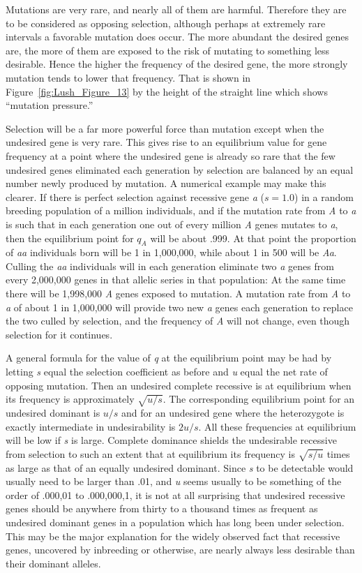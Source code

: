 Mutations are very rare, and nearly all of them are harmful. Therefore
they are to be considered as opposing selection, although perhaps
at extremely rare intervals a favorable mutation does occur. The more
abundant the desired genes are, the more of them are exposed to the
risk of mutating to something less desirable. Hence the higher the frequency
of the desired gene, the more strongly mutation tends to lower
that frequency. That is shown in Figure~\ref{fig:Lush_Figure_13} by the height of the straight
line which shows ``mutation pressure.''

Selection will be a far more powerful force than mutation except
when the undesired gene is very rare. This gives rise to an equilibrium
value for gene frequency at a point where the undesired gene is already
so rare that the few undesired genes eliminated each generation by
selection are balanced by an equal number newly produced by mutation.
A numerical example may make this clearer. If there is perfect
selection against recessive gene \textit{a} ($s = 1.0$) in a random breeding population
of a million individuals, and if the mutation rate from \textit{A} to \textit{a} is
such that in each generation one out of every million \textit{A} genes mutates
to \textit{a}, then the equilibrium point for $q_A$ will be about .999. At that point
the proportion of \textit{aa} individuals born will be 1 in 1,000,000, while
about 1 in 500 will be \textit{Aa}. Culling the \textit{aa} individuals will in each generation
eliminate two \textit{a} genes from every 2,000,000 genes in that allelic
series in that population: At the same time there will be 1,998,000 \textit{A}
genes exposed to mutation. A mutation rate from \textit{A} to \textit{a} of about 1 in
1,000,000 will provide two new \textit{a} genes each generation to replace the
two culled by selection, and the frequency of \textit{A} will not change, even
though selection for it continues.

A general formula for the value of \textit{q} at the equilibrium point may
be had by letting \textit{s} equal the selection coefficient as before and \textit{u} equal
the net rate of opposing mutation. Then an undesired complete recessive
is at equilibrium when its frequency is approximately $\sqrt{u/s}$. The
corresponding equilibrium point for an undesired dominant is $u/s$
and for an undesired gene where the heterozygote is exactly intermediate
in undesirability is $2u/s$. All these frequencies at equilibrium will
be low if \textit{s} is large. Complete dominance shields the undesirable recessive
from selection to such an extent that at equilibrium its frequency is
$\sqrt{s/u}$ times as large as that of an equally undesired dominant. Since \textit{s}
to be detectable would usually need to be larger than .01, and \textit{u} seems
usually to be something of the order of .000,01 to .000,000,1, it is not at
all surprising that undesired recessive genes should be anywhere from
thirty to a thousand times as frequent as undesired dominant genes in a
population which has long been under selection. This may be the major
explanation for the widely observed fact that recessive genes, uncovered
by inbreeding or otherwise, are nearly always less desirable than their
dominant alleles.

